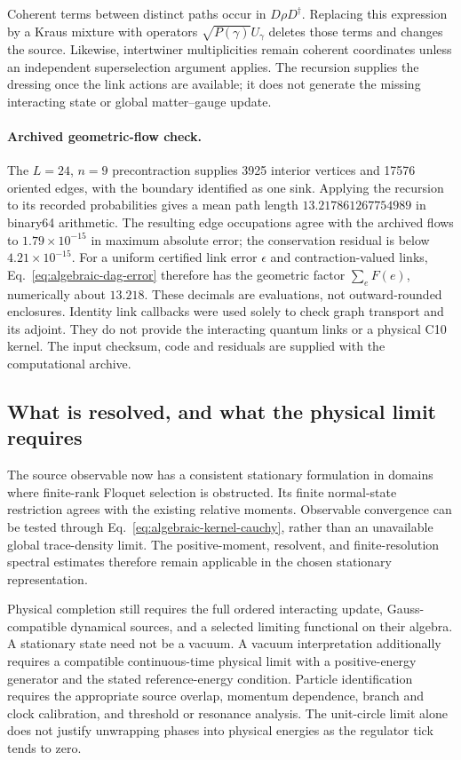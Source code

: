 Coherent terms between distinct paths occur in $D\rho D^\dagger$.
Replacing this expression by a Kraus mixture with operators
$\sqrt{P(\gamma)}U_\gamma$ deletes those terms and changes the source.
Likewise, intertwiner multiplicities remain coherent coordinates unless an
independent superselection argument applies. The recursion supplies the
dressing once the link actions are available; it does not generate the
missing interacting state or global matter--gauge update.

\paragraph{Archived geometric-flow check.}
The $L=24$, $n=9$ precontraction supplies 3925 interior vertices and 17576
oriented edges, with the boundary identified as one sink. Applying the
recursion to its recorded probabilities gives a mean path length
$13.217861267754989$ in binary64 arithmetic. The resulting edge occupations
agree with the archived flows to $1.79\times10^{-15}$ in maximum absolute
error; the conservation residual is below $4.21\times10^{-15}$.
For a uniform certified link error $\epsilon$ and contraction-valued links,
Eq.~\eqref{eq:algebraic-dag-error} therefore has the geometric factor
$\sum_e F(e)$, numerically about $13.218$. These decimals are evaluations,
not outward-rounded enclosures. Identity link callbacks were used solely
to check graph transport and its adjoint. They do not provide the
interacting quantum links or a physical C10 kernel. The input checksum,
code and residuals are supplied with the computational archive.

\subsection{What is resolved, and what the physical limit requires}

The source observable now has a consistent stationary formulation in domains
where finite-rank Floquet selection is obstructed. Its finite normal-state
restriction agrees with the existing relative moments. Observable convergence
can be tested through Eq.~\eqref{eq:algebraic-kernel-cauchy}, rather than an
unavailable global trace-density limit. The positive-moment, resolvent, and
finite-resolution spectral estimates therefore remain applicable in the
chosen stationary representation.

Physical completion still requires the full ordered interacting update,
Gauss-compatible dynamical sources, and a selected limiting functional on
their algebra. A stationary state need not be a vacuum. A vacuum
interpretation additionally requires a compatible continuous-time physical
limit with a positive-energy generator and the stated reference-energy
condition. Particle identification requires the appropriate source overlap,
momentum dependence, branch and clock calibration, and threshold or
resonance analysis. The unit-circle limit alone does not justify unwrapping
phases into physical energies as the regulator tick tends to zero.

